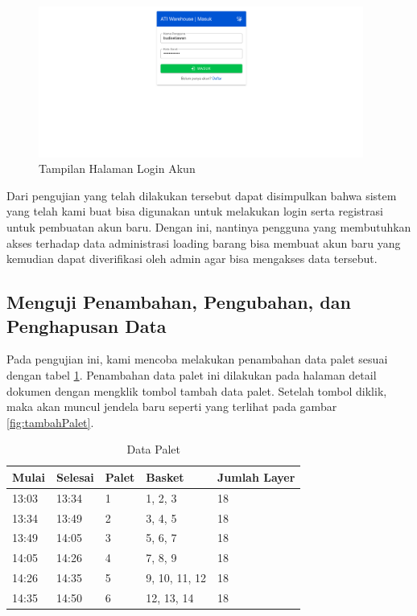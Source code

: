 \begin{figure} [ht!] \centering
  \includegraphics[width=0.95\textwidth]{gambar/login-akun.png}
  \caption{Tampilan Halaman Login Akun}
  \label{fig:loginAkun}
\end{figure}

Dari pengujian yang telah dilakukan tersebut dapat disimpulkan bahwa sistem yang telah kami buat bisa digunakan untuk melakukan login serta registrasi untuk pembuatan akun baru.
Dengan ini, nantinya pengguna yang membutuhkan akses terhadap data administrasi loading barang bisa membuat akun baru yang kemudian dapat diverifikasi oleh admin agar bisa mengakses data tersebut.
\vspace{0.5ex}

\subsection{Menguji Penambahan, Pengubahan, dan Penghapusan Data}
\vspace{1ex}

Pada pengujian ini, kami mencoba melakukan penambahan data palet sesuai dengan tabel \ref{tb:dataPalet}.
Penambahan data palet ini dilakukan pada halaman detail dokumen dengan mengklik tombol tambah data palet.
Setelah tombol diklik, maka akan muncul jendela baru seperti yang terlihat pada gambar \ref{fig:tambahPalet}.
\vspace{0.5ex}

\begin{longtable}{|l|l|l|l|l|}
  \caption{Data Palet}
  \label{tb:dataPalet}\\
  \hline
  \rowcolor[HTML]{C0C0C0}
  \textbf{Mulai} & \textbf{Selesai} & \textbf{Palet} & \textbf{Basket} & \textbf{Jumlah Layer} \\ \hline
  13:03 & 13:34 & 1 & 1, 2, 3 & 18 \\ \hline
  13:34 & 13:49 & 2 & 3, 4, 5 & 18 \\ \hline
  13:49 & 14:05 & 3 & 5, 6, 7 & 18 \\ \hline
  14:05 & 14:26 & 4 & 7, 8, 9 & 18 \\ \hline
  14:26 & 14:35 & 5 & 9, 10, 11, 12 & 18 \\ \hline
  14:35 & 14:50 & 6 & 12, 13, 14 & 18 \\ \hline
\end{longtable}

